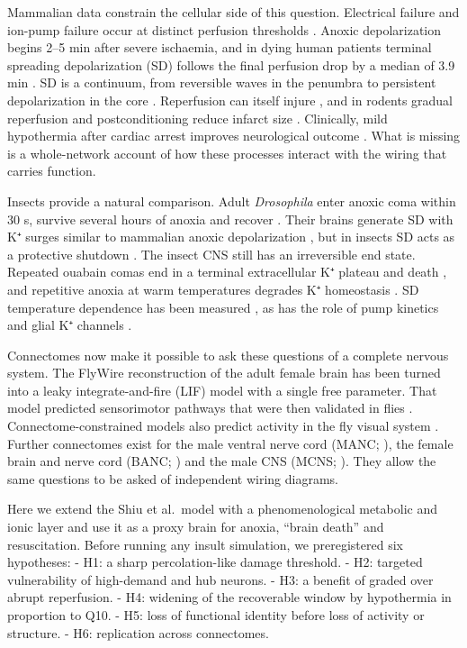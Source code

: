 \documentclass[11pt]{article}
\begin{document}
Mammalian data constrain the cellular side of this question. Electrical failure and ion-pump failure occur at distinct perfusion thresholds \cite{astrup1981,hossmann1994}. Anoxic depolarization begins 2--5 min after severe ischaemia, and in dying human patients terminal spreading depolarization (SD) follows the final perfusion drop by a median of 3.9 min \cite{dreier2018}. SD is a continuum, from reversible waves in the penumbra to persistent depolarization in the core \cite{dreier2011,dreier2015,hartings2016}. Reperfusion can itself injure \cite{eltzschig2011,choi1988}, and in rodents gradual reperfusion and postconditioning reduce infarct size \cite{gao2008,zhao2009}. Clinically, mild hypothermia after cardiac arrest improves neurological outcome \cite{haca2002,bernard2002}. What is missing is a whole-network account of how these processes interact with the wiring that carries function.

Insects provide a natural comparison. Adult \emph{Drosophila} enter anoxic coma within 30 s, survive several hours of anoxia and recover \cite{krishnan1997,campbell2018,callier2015}. Their brains generate SD with K⁺ surges similar to mammalian anoxic depolarization \cite{spong2016,armstrong2011,andersen2018}, but in insects SD acts as a protective shutdown \cite{rodgers2010,robertson2020}. The insect CNS still has an irreversible end state. Repeated ouabain comas end in a terminal extracellular K⁺ plateau and death \cite{armstrong2011}, and repetitive anoxia at warm temperatures degrades K⁺ homeostasis \cite{rodriguez2012}. SD temperature dependence has been measured \cite{andersen2025}, as has the role of pump kinetics \cite{andersen2022} and glial K⁺ channels \cite{andersen2026}.

Connectomes now make it possible to ask these questions of a complete nervous system. The FlyWire reconstruction of the adult female brain \cite{zheng2018,dorkenwald2024,schlegel2024} has been turned into a leaky integrate-and-fire (LIF) model with a single free parameter. That model predicted sensorimotor pathways that were then validated in flies \cite{shiu2024}. Connectome-constrained models also predict activity in the fly visual system \cite{lappalainen2024}. Further connectomes exist for the male ventral nerve cord (MANC; \cite{takemura2024,marin2024,cheong2026}), the female brain and nerve cord (BANC; \cite{bates2026}) and the male CNS (MCNS; \cite{berg2026}). They allow the same questions to be asked of independent wiring diagrams.

Here we extend the Shiu et al.~model with a phenomenological metabolic and ionic layer and use it as a proxy brain for anoxia, ``brain death'' and resuscitation. Before running any insult simulation, we preregistered six hypotheses:
- H1: a sharp percolation-like damage threshold.
- H2: targeted vulnerability of high-demand and hub neurons.
- H3: a benefit of graded over abrupt reperfusion.
- H4: widening of the recoverable window by hypothermia in proportion to Q10.
- H5: loss of functional identity before loss of activity or structure.
- H6: replication across connectomes.
\end{document}
